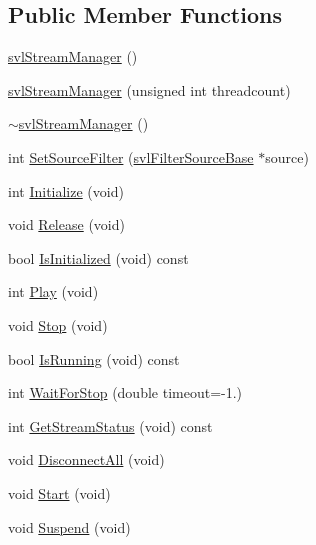 \subsection*{Public Member Functions}
\begin{DoxyCompactItemize}
\item 
\hyperlink{classsvl_stream_manager_a68ff7a941266f0906331aa3afccb778c}{svl\+Stream\+Manager} ()
\item 
\hyperlink{classsvl_stream_manager_a5d1b8134aa11537f167b51fc37d04b6d}{svl\+Stream\+Manager} (unsigned int threadcount)
\item 
\hyperlink{classsvl_stream_manager_a6bcc10c3012b0dd0d8a0fdb6c28cc46d}{$\sim$svl\+Stream\+Manager} ()
\item 
int \hyperlink{classsvl_stream_manager_aedd7f5b0f3f9542bf9d36b5b4848bffd}{Set\+Source\+Filter} (\hyperlink{classsvl_filter_source_base}{svl\+Filter\+Source\+Base} $\ast$source)
\item 
int \hyperlink{classsvl_stream_manager_a63d7780527caa9d39ab02a87cf736025}{Initialize} (void)
\item 
void \hyperlink{classsvl_stream_manager_a965dd0cc4055c77af739aa4c590a4e3f}{Release} (void)
\item 
bool \hyperlink{classsvl_stream_manager_aee755c1e0a31caf0390ab556919ced91}{Is\+Initialized} (void) const 
\item 
int \hyperlink{classsvl_stream_manager_a45adcd750e21702136ee31a990961fa8}{Play} (void)
\item 
void \hyperlink{classsvl_stream_manager_a291907660704e8c6baf1364933a1b09a}{Stop} (void)
\item 
bool \hyperlink{classsvl_stream_manager_a18b7bab00b796854ef65bc250217a4c4}{Is\+Running} (void) const 
\item 
int \hyperlink{classsvl_stream_manager_a974d869b5b117d7ea87f7e4fa59c5a5c}{Wait\+For\+Stop} (double timeout=-\/1.)
\item 
int \hyperlink{classsvl_stream_manager_a2fa049bd09f47b1d1449be7998e279ab}{Get\+Stream\+Status} (void) const 
\item 
void \hyperlink{classsvl_stream_manager_aedf2a8db4ac9fe6e87be13f9f99fe14d}{Disconnect\+All} (void)
\item 
void \hyperlink{classsvl_stream_manager_ad058664024ee544c2cd79338dc5592b7}{Start} (void)
\item 
void \hyperlink{classsvl_stream_manager_a5cc3d23d1cb765fed83376908ec5a30a}{Suspend} (void)
\end{DoxyCompactItemize}
